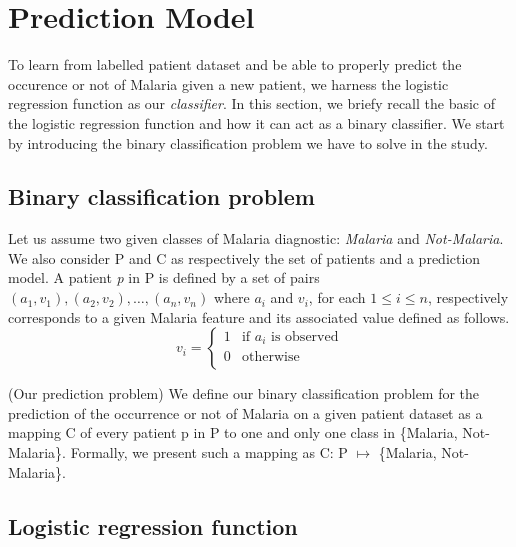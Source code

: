 \section{Prediction Model}\label{prediction_model}
To learn from labelled patient dataset and be able to properly predict 
the occurence or not of Malaria given a new patient, we harness the logistic 
regression function as our \emph{classifier}. 
In this section, we briefy recall the basic of the logistic regression function
and how it can act as a binary classifier. We start by introducing the binary 
classification problem we have to solve in the study.

\subsection{Binary classification problem}
Let us assume two given classes of Malaria diagnostic: \emph{Malaria} and \emph{Not-Malaria}.
We also consider \textsc{P} and \textsc{C} as respectively the set of patients and a prediction model.
A patient \emph{p} in \textsc{P} is defined by a set of pairs $(a_1, v_1), (a_2, v_2), \ldots, (a_n, v_n)$
where $a_i$ and $v_i$, for each $1\leq i\leq n$, respectively corresponds to a given Malaria feature and its associated value defined
as follows.
\begin{equation}
v_i = \left\{
\begin{array}{rl}
1 &\text{if $a_i$ is observed} \\
0 &\text{otherwise} \\
\end{array}
\right.
\end{equation}

\begin{definition}{(Our prediction problem)}
We define our binary classification problem for the prediction of the occurrence
 or not of Malaria on a given patient dataset as a mapping \textsc{C} of every patient p in \textsc{P} 
to one and only one class in \{Malaria, Not-Malaria\}. Formally, we present such a mapping as \textsc{C}: \textsc{P} $\mapsto$ \{Malaria, Not-Malaria\}.
\end{definition}
\subsection{Logistic regression function}
